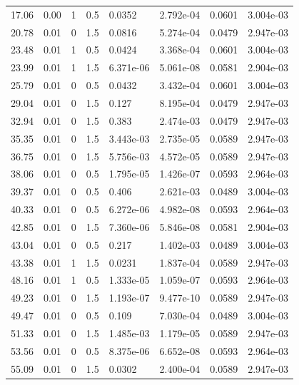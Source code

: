 \documentclass[preview]{standalone}
\begin{document}
{{\begin{tabular}{L{1.2cm}C{1.2cm} C{0.3cm}C{0.5cm} C{1.4cm}C{1.4cm} C{1.4cm}C{1.4cm}}
  17.06  &  0.00  & 1     & 0.5 &  0.0352  & 2.792e-04  & 0.0601 &  3.004e-03   \\ 
  20.78  &  0.01  & 0     & 1.5 &  0.0816  & 5.274e-04  & 0.0479 &  2.947e-03   \\ 
  23.48  &  0.01  & 1     & 0.5 &  0.0424  & 3.368e-04  & 0.0601 &  3.004e-03   \\ 
  23.99  &  0.01  & 1     & 1.5 &  6.371e-06  & 5.061e-08  & 0.0581 &  2.904e-03   \\ 
  25.79  &  0.01  & 0     & 0.5 &  0.0432  & 3.432e-04  & 0.0601 &  3.004e-03   \\ 
  29.04  &  0.01  & 0     & 1.5 &  0.127  & 8.195e-04  & 0.0479 &  2.947e-03   \\ 
  32.94  &  0.01  & 0     & 1.5 &  0.383  & 2.474e-03  & 0.0479 &  2.947e-03   \\ 
  35.35  &  0.01  & 0     & 1.5 &  3.443e-03  & 2.735e-05  & 0.0589 &  2.947e-03   \\ 
  36.75  &  0.01  & 0     & 1.5 &  5.756e-03  & 4.572e-05  & 0.0589 &  2.947e-03   \\ 
  38.06  &  0.01  & 0     & 0.5 &  1.795e-05  & 1.426e-07  & 0.0593 &  2.964e-03   \\ 
  39.37  &  0.01  & 0     & 0.5 &  0.406  & 2.621e-03  & 0.0489 &  3.004e-03   \\ 
  40.33  &  0.01  & 0     & 0.5 &  6.272e-06  & 4.982e-08  & 0.0593 &  2.964e-03   \\ 
  42.85  &  0.01  & 0     & 1.5 &  7.360e-06  & 5.846e-08  & 0.0581 &  2.904e-03   \\ 
  43.04  &  0.01  & 0     & 0.5 &  0.217  & 1.402e-03  & 0.0489 &  3.004e-03   \\ 
  43.38  &  0.01  & 1     & 1.5 &  0.0231  & 1.837e-04  & 0.0589 &  2.947e-03   \\ 
  48.16  &  0.01  & 1     & 0.5 &  1.333e-05  & 1.059e-07  & 0.0593 &  2.964e-03   \\ 
  49.23  &  0.01  & 0     & 1.5 &  1.193e-07  & 9.477e-10  & 0.0589 &  2.947e-03   \\ 
  49.47  &  0.01  & 0     & 0.5 &  0.109  & 7.030e-04  & 0.0489 &  3.004e-03   \\ 
  51.33  &  0.01  & 0     & 1.5 &  1.485e-03  & 1.179e-05  & 0.0589 &  2.947e-03   \\ 
  53.56  &  0.01  & 0     & 0.5 &  8.375e-06  & 6.652e-08  & 0.0593 &  2.964e-03   \\ 
  55.09  &  0.01  & 0     & 1.5 &  0.0302  & 2.400e-04  & 0.0589 &  2.947e-03   \\ 

\end{tabular}}}
\end{document}
